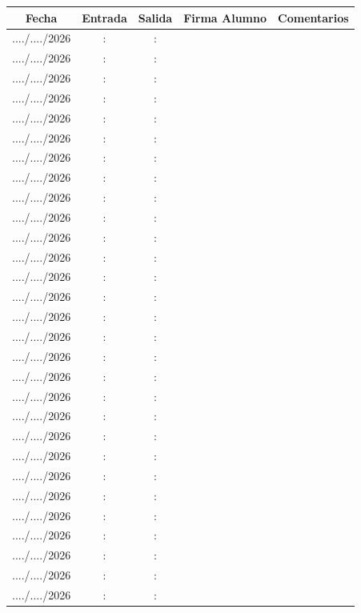 \documentclass[../main]{subfiles}
\begin{document}
\begin{table}[h]
    \centering
    \begin{tabular}{|c|c|c|p{5cm}|p{5cm}|} \hline 
         Fecha& Entrada &Salida & Firma Alumno& Comentarios  \\\hline \hline
       ..../..../2026 & : & : & & \\ \hline
       ..../..../2026 & : & : & & \\ \hline
       ..../..../2026 & : & : & & \\ \hline
       ..../..../2026 & : & : & & \\ \hline
       ..../..../2026 & : & : & & \\ \hline
       ..../..../2026 & : & : & & \\ \hline
       ..../..../2026 & : & : & & \\ \hline
       ..../..../2026 & : & : & & \\ \hline
       ..../..../2026 & : & : & & \\ \hline
       ..../..../2026 & : & : & & \\ \hline
       ..../..../2026 & : & : & & \\ \hline
       ..../..../2026 & : & : & & \\ \hline
       ..../..../2026 & : & : & & \\ \hline
       ..../..../2026 & : & : & & \\ \hline
       ..../..../2026 & : & : & & \\ \hline
       ..../..../2026 & : & : & & \\ \hline
       ..../..../2026 & : & : & & \\ \hline
       ..../..../2026 & : & : & & \\ \hline
       ..../..../2026 & : & : & & \\ \hline
       ..../..../2026 & : & : & & \\ \hline
       ..../..../2026 & : & : & & \\ \hline
       ..../..../2026 & : & : & & \\ \hline
       ..../..../2026 & : & : & & \\ \hline
       ..../..../2026 & : & : & & \\ \hline
       ..../..../2026 & : & : & & \\ \hline
       ..../..../2026 & : & : & & \\ \hline
       ..../..../2026 & : & : & & \\ \hline
       ..../..../2026 & : & : & & \\ \hline
       ..../..../2026 & : & : & & \\ \hline
 
      
    
    \end{tabular}
\end{table}
\end{document}

